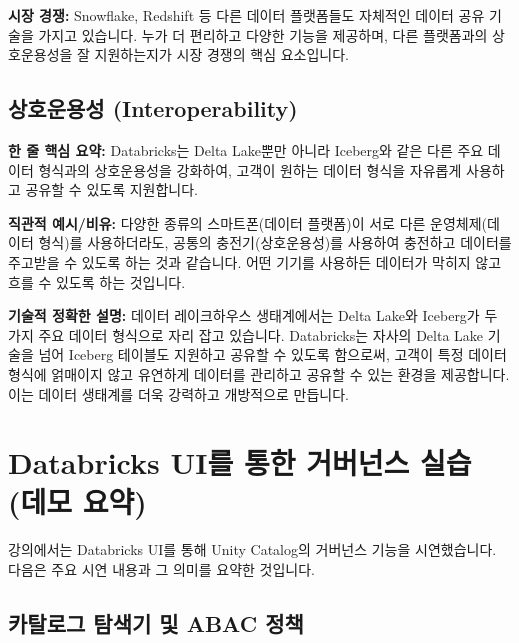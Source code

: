 \documentclass[11pt,a4paper]{article}
\theoremstyle{definition}
\begin{document}
\begin{tcolorbox}[summarybox]
\textbf{시장 경쟁:}
Snowflake, Redshift 등 다른 데이터 플랫폼들도 자체적인 데이터 공유 기술을 가지고 있습니다. 누가 더 편리하고 다양한 기능을 제공하며, 다른 플랫폼과의 상호운용성을 잘 지원하는지가 시장 경쟁의 핵심 요소입니다.
\end{tcolorbox}

\newpage
\subsection*{상호운용성 (Interoperability)}

\begin{keyconceptbox}
\textbf{한 줄 핵심 요약:} Databricks는 Delta Lake뿐만 아니라 Iceberg와 같은 다른 주요 데이터 형식과의 상호운용성을 강화하여, 고객이 원하는 데이터 형식을 자유롭게 사용하고 공유할 수 있도록 지원합니다.
\end{keyconceptbox}

\textbf{직관적 예시/비유:}
다양한 종류의 스마트폰(데이터 플랫폼)이 서로 다른 운영체제(데이터 형식)를 사용하더라도, 공통의 충전기(상호운용성)를 사용하여 충전하고 데이터를 주고받을 수 있도록 하는 것과 같습니다. 어떤 기기를 사용하든 데이터가 막히지 않고 흐를 수 있도록 하는 것입니다.

\textbf{기술적 정확한 설명:}
데이터 레이크하우스 생태계에서는 Delta Lake와 Iceberg가 두 가지 주요 데이터 형식으로 자리 잡고 있습니다. Databricks는 자사의 Delta Lake 기술을 넘어 Iceberg 테이블도 지원하고 공유할 수 있도록 함으로써, 고객이 특정 데이터 형식에 얽매이지 않고 유연하게 데이터를 관리하고 공유할 수 있는 환경을 제공합니다. 이는 데이터 생태계를 더욱 강력하고 개방적으로 만듭니다.

\newpage
\section*{Databricks UI를 통한 거버넌스 실습 (데모 요약)}

강의에서는 Databricks UI를 통해 Unity Catalog의 거버넌스 기능을 시연했습니다. 다음은 주요 시연 내용과 그 의미를 요약한 것입니다.

\subsection*{카탈로그 탐색기 및 ABAC 정책}
\end{document}
